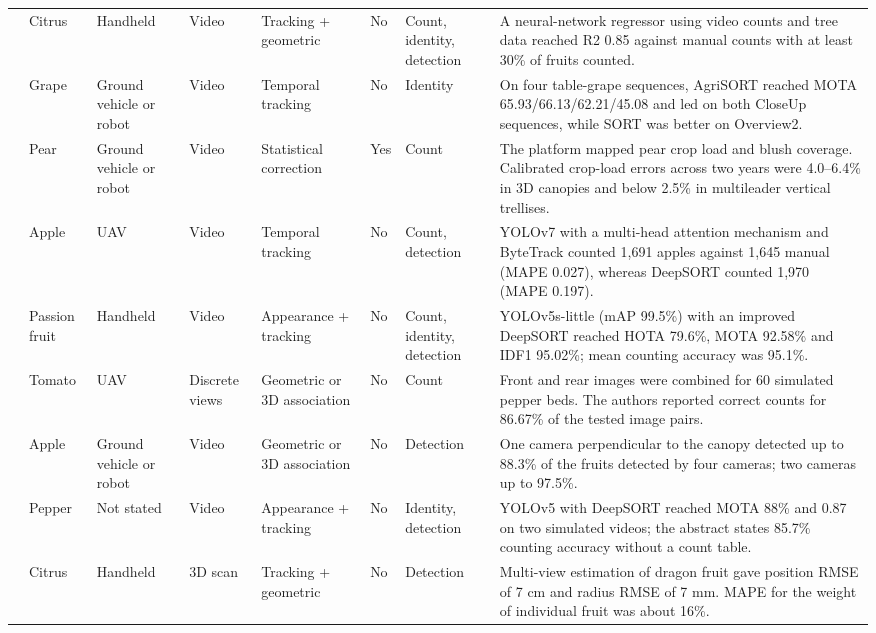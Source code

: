 \begin{footnotesize}
\begin{longtable}{@{}L{2.5cm}L{1.3cm}L{1.6cm}L{1.4cm}L{2.2cm}L{0.9cm}L{1.5cm}L{\dimexpr\linewidth-11.4cm-14\tabcolsep\relax}@{}}
\citet{santos2024multiple} & Citrus & Handheld & Video & Tracking + geometric & No & Count, identity, detection & A neural-network regressor using video counts and tree data reached R2 0.85 against manual counts with at least 30\% of fruits counted. \\
\citet{saraceni2024agrisort} & Grape & Ground vehicle or robot & Video & Temporal tracking & No & Identity & On four table-grape sequences, AgriSORT reached MOTA 65.93/66.13/62.21/45.08 and led on both CloseUp sequences, while SORT was better on Overview2. \\
\citet{scalisi2024detecting} & Pear & Ground vehicle or robot & Video & Statistical correction & Yes & Count & The platform mapped pear crop load and blush coverage. Calibrated crop-load errors across two years were 4.0--6.4\% in 3D canopies and below 2.5\% in multileader vertical trellises. \\
\citet{sekharamantry2024seamless} & Apple & UAV & Video & Temporal tracking & No & Count, detection & YOLOv7 with a multi-head attention mechanism and ByteTrack counted 1,691 apples against 1,645 manual (MAPE 0.027), whereas DeepSORT counted 1,970 (MAPE 0.197). \\
\citet{tu2024passion} & Passion fruit & Handheld & Video & Appearance + tracking & No & Count, identity, detection & YOLOv5s-little (mAP 99.5\%) with an improved DeepSORT reached HOTA 79.6\%, MOTA 92.58\% and IDF1 95.02\%; mean counting accuracy was 95.1\%. \\
\citet{vasconcelos2024uav} & Tomato & UAV & Discrete views & Geometric or 3D association & No & Count & Front and rear images were combined for 60 simulated pepper beds. The authors reported correct counts for 86.67\% of the tested image pairs. \\
\citet{villacres2024assessing} & Apple & Ground vehicle or robot & Video & Geometric or 3D association & No & Detection & One camera perpendicular to the canopy detected up to 88.3\% of the fruits detected by four cameras; two cameras up to 97.5\%. \\
\citet{viveros2024maturity} & Pepper & Not stated & Video & Appearance + tracking & No & Identity, detection & YOLOv5 with DeepSORT reached MOTA 88\% and 0.87 on two simulated videos; the abstract states 85.7\% counting accuracy without a count table. \\
\citet{wang2024slam} & Citrus & Handheld & 3D scan & Tracking + geometric & No & Detection & Multi-view estimation of dragon fruit gave position RMSE of 7 cm and radius RMSE of 7 mm. MAPE for the weight of individual fruit was about 16\%. \\

\end{longtable}
\end{footnotesize}
